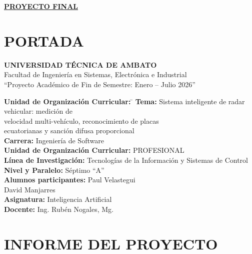 \documentclass[11pt]{article}
\begin{document}
\renewcommand{\figurename}{Figura}
\renewcommand{\tablename}{Tabla}
\renewcommand{\thesection}{\Roman{section}}

\begin{center}
    \textbf{\underline{\normalsize PROYECTO FINAL}}
\end{center}

\section{PORTADA}

\begin{center}
    \textbf{UNIVERSIDAD TÉCNICA DE AMBATO}\\
    Facultad de Ingeniería en Sistemas, Electrónica e Industrial\\
    ``Proyecto Académico de Fin de Semestre: Enero -- Julio 2026''
\end{center}

\begin{tabbing}
    \textbf{Unidad de Organización Curricular:}\hspace{0.6cm} \= \kill
    \textbf{Tema:} \> Sistema inteligente de radar vehicular: medición de \\
    \> velocidad multi-vehículo, reconocimiento de placas \\
    \> ecuatorianas y sanción difusa proporcional \\[0.25em]
    \textbf{Carrera:} \> Ingeniería de Software \\[0.25em]
    \textbf{Unidad de Organización Curricular:} \> PROFESIONAL \\[0.25em]
    \textbf{Línea de Investigación:} \> Tecnologías de la Información y Sistemas de Control \\[0.25em]
    \textbf{Nivel y Paralelo:} \> Séptimo ``A'' \\[0.25em]
    \textbf{Alumnos participantes:} \> Paul Velastegui \\
    \> David Manjarres \\[0.25em]
    \textbf{Asignatura:} \> Inteligencia Artificial \\[0.25em]
    \textbf{Docente:} \> Ing. Rubén Nogales, Mg.
\end{tabbing}

\section{INFORME DEL PROYECTO}
\renewcommand{\thesection}{\arabic{section}}
\setcounter{section}{0}
\end{document}

